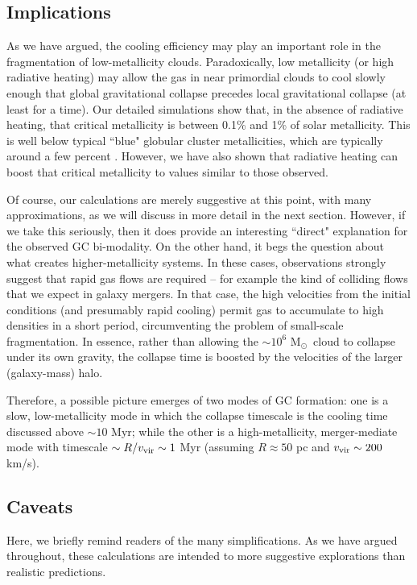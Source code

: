 \documentclass[useAMS,usenatbib]{mn2e}
\newcommand{\msun}{{M$_\odot$}}
\begin{document}
\subsection{Implications}

As we have argued, the cooling efficiency may play an important role in the fragmentation of low-metallicity clouds.  Paradoxically, low metallicity (or high radiative heating) may allow the gas in near primordial clouds to cool slowly enough that global gravitational collapse precedes local gravitational collapse (at least for a time).  Our detailed simulations show that, in the absence of radiative heating, that critical metallicity is between 0.1\% and 1\% of solar metallicity.  This is well below typical ``blue" globular cluster metallicities, which are typically around a few percent \citep{West2004}.  However, we have also shown that radiative heating can boost that critical metallicity to values similar to those observed.


Of course, our calculations are merely suggestive at this point, with many approximations, as we will discuss in more detail in the next section.  However, if we take this seriously, then it does provide an interesting ``direct" explanation for the observed GC bi-modality.  On the other hand, it begs the question about what creates higher-metallicity systems.  In these cases, observations strongly suggest that rapid gas flows are required -- for example the kind of colliding flows that we expect in galaxy mergers.  In that case, the high velocities from the initial conditions (and presumably rapid cooling) permit gas to accumulate to high densities in a short period, circumventing the problem of small-scale fragmentation.  In essence, rather than allowing the $\sim 10^6$ \msun\ cloud to collapse under its own gravity, the collapse time is boosted by the velocities of the larger (galaxy-mass) halo.  

Therefore, a possible picture emerges of two modes of GC formation: one is a slow, low-metallicity mode in which the collapse timescale is the cooling time discussed above $\sim 10$ Myr; while the other is a high-metallicity, merger-mediate mode with timescale $\sim R/v_{\rm vir} \sim 1$ Myr (assuming $R \approx 50$ pc and $v_{\rm vir} \sim 200$ km/s).

\subsection{Caveats}

Here, we briefly remind readers of the many simplifications.  As we have argued throughout, these calculations are intended to more suggestive explorations than realistic predictions.  
\end{document}
